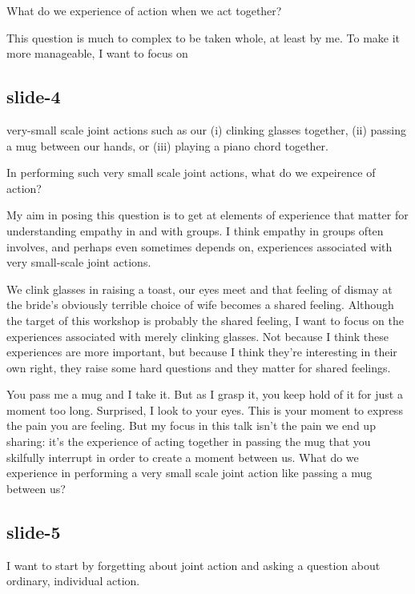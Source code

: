 \documentclass[12pt,\papersize]{extarticle}
\begin{document}
\setlength\footnotesep{1em}







What do we experience of action when we act together?

This question is much to complex to be taken whole, at least by me.
To make it more manageable, I want to focus on

\subsection{slide-4}
very-small scale joint actions
such as our (i) clinking glasses together, (ii) passing a mug between our hands,
or (iii) playing a piano chord together.

In performing such very small scale joint actions, what do we expeirence of action?

My aim in posing this question is to get at elements of experience that matter
for understanding empathy in and with groups.
I think empathy in groups often involves, and perhaps even sometimes depends on,
experiences associated with very small-scale joint actions.

We clink glasses in raising a toast, our eyes meet and that feeling of dismay
at the bride’s obviously terrible choice of wife becomes a shared feeling.
Although the target of this workshop is probably the shared feeling, I want to focus
on the experiences associated with merely clinking glasses.
Not because I think these experiences are more important, but because I think
they’re interesting in their own right, they raise some hard questions
and they matter for shared feelings.

You pass me a mug and I take it.
But as I grasp it, you keep hold of it for just a moment too long.
Surprised, I look to your eyes.
This is your moment to express the pain you are feeling.
But my focus in this talk isn’t the pain we end up sharing: it’s the
experience of acting together in passing the mug that you
skilfully interrupt in order to create a moment between us.
What do we experience in performing a very small scale joint action like
passing a mug between us?

\subsection{slide-5}
I want to start by forgetting about joint action and asking a question about
ordinary, individual action.
\end{document}
